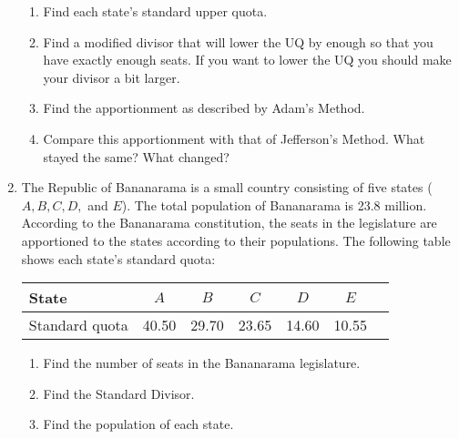 \begin{enumerate}
\begin{enumerate}
	\normalsize
		\item Find each state's standard upper quota.
			\item Find a modified divisor that will lower the UQ by enough so that you have exactly enough seats.  If you want to lower the UQ you should make your divisor a bit larger.
		\item Find the apportionment as described by Adam's Method.
		\item Compare this apportionment with that of Jefferson's Method.  What stayed the same?  What changed?
	\end{enumerate} \vfill
	
	\clearpage
	\item The Republic of Bananarama is  a small country consisting of five states ($A, B, C, D,$ and $E$).  The total population of Bananarama is 23.8 million.  According to the Bananarama constitution, the seats in the legislature are apportioned to the states according to their populations.  The following table shows each state's standard quota:
	
	\begin{center}
	\begin{tabular}{lcccccc}
State & $A$ & $B$ & $C$ & $D$ & $E$ \\\hline
Standard quota &40.50 & 29.70 & 23.65 & 14.60 & 10.55 \\\hline
\end{tabular}
\end{center}
	\begin{enumerate}
	\item Find the number of seats in the Bananarama legislature.
	\item Find the Standard Divisor.
	\item Find the population of each state.
	

\end{enumerate}
\end{enumerate}
